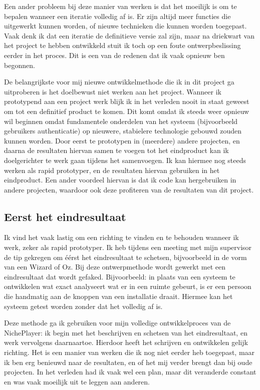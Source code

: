Een ander probleem bij  deze manier van werken is dat het moeilijk is om te bepalen wanneer een iteratie volledig af is. Er zijn altijd meer functies die uitgewerkt kunnen worden, of nieuwe technieken die kunnen worden toegepast. Vaak denk ik dat een iteratie de definitieve versie zal zijn, maar na driekwart van het project te hebben ontwikkeld stuit ik toch op een foute ontwerpbeslissing eerder in het proces. Dit is een van de redenen dat ik vaak opnieuw ben begonnen.

De belangrijkste voor mij nieuwe ontwikkelmethode die ik in dit project ga uitproberen is het doelbewust niet werken aan het project. Wanneer ik prototypend aan een project werk blijk ik in het verleden nooit in staat geweest om tot een definitief product te komen. Dit komt omdat ik steeds weer opnieuw wil beginnen omdat fundamentele onderdelen van het systeem (bijvoorbeeld gebruikers authenticatie) op nieuwere, stabielere technologie gebouwd zouden kunnen worden. Door eerst te prototypen in (meerdere) andere projecten, en daarna de resultaten hiervan samen te voegen tot het eindproduct kan ik doelgerichter te werk gaan tijdens het samenvoegen. Ik kan hiermee nog steeds werken als rapid prototyper, en de resultaten hiervan gebruiken in het eindproduct. Een ander voordeel hiervan is dat ik code kan hergebruiken in andere projecten, waardoor ook deze profiteren van de resultaten van dit project.

\subsection{Eerst het eindresultaat}
Ik vind het vaak lastig om een richting te vinden en te behouden wanneer ik werk, zeker als rapid prototyper. Ik heb tijdens een meeting met mijn supervisor de tip gekregen om éérst het eindresultaat te schetsen, bijvoorbeeld in de vorm van een Wizard of Oz. Bij deze ontwerpmethode wordt gewerkt met een eindresultaat dat wordt gefaked. Bijvoorbeeld: in plaats van een systeem te ontwikkelen wat exact analyseert wat er in een ruimte gebeurt, is er een persoon die handmatig aan de knoppen van een installatie draait. Hiermee kan het systeem getest worden zonder dat het volledig af is.

Deze methode ga ik gebruiken voor mijn volledige ontwikkelproces van de NichePlayer: ik begin met het beschrijven en schetsen van het eindresultaat, en werk vervolgens daarnaartoe. Hierdoor heeft het schrijven en ontwikkelen gelijk richting. Het is een manier van werken die ik nog niet eerder heb toegepast, maar ik ben erg benieuwd naar de resultaten, en of het mij verder brengt dan bij oude projecten. In het verleden had ik vaak wel een plan, maar dit veranderde constant en was vaak moeilijk uit te leggen aan anderen.

